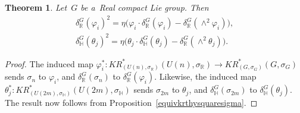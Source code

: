\documentclass[11pt]{article}
\numberwithin{equation}{section}
\newtheorem{Theorem}{Theorem}[section]
\begin{document}
\begin{Theorem}
\label{equivkrthysquare}
Let~$G$ be a~Real compact Lie group.
Then
\begin{gather}
\label{realsquare}
\delta_\mathbb{R}^G(\varphi_i)^2
=\eta\big(\varphi_i\cdot\delta_\mathbb{R}^G(\varphi_i)-\delta_\mathbb{R}^G(\wedge^2\varphi_i)\big),
\\
\label{quatsquare}
\delta_\mathbb{H}^G(\theta_j)^2
=\eta\big(\theta_j\cdot\delta_\mathbb{H}^G(\theta_j)-\delta_\mathbb{R}^G(\wedge^2\theta_j)\big).
\end{gather}
\end{Theorem}
\begin{proof}
The induced map $\varphi_i^*: KR^*_{(U(n),
\sigma_\mathbb{R})}(U(n),
\sigma_\mathbb{R})\to KR^*_{(G,
\sigma_G)}
(G,
\sigma_G)$ sends $\sigma_n$ to $\varphi_i$, and $\delta_\mathbb{R}^G(\sigma_n)$ to $\delta_\mathbb{R}^G(\varphi_i)$.
Likewise, the induced map $\theta_j^*: KR^*_{(U(2m),
\sigma_\mathbb{H})}(U(2m),
\sigma_\mathbb{H})$ sends $\sigma_{2m}$ to $\theta_j$, and $\delta_\mathbb{H}^G(\sigma_{2m})$ to $\delta_\mathbb{H}^G(\theta_j)$.
The result now follows from Proposition~\ref{equivkrthysquaresigma}.
\end{proof}
\end{document}
